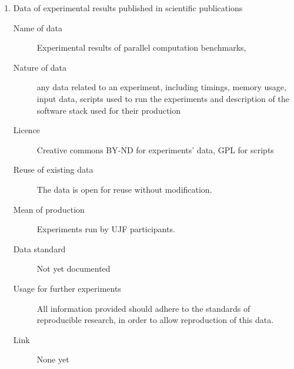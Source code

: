 \documentclass[12pt]{article}
\begin{document}
\begin{enumerate}
\item{Data of experimental results published in scientific publications}

\begin{description}
\item[Name of data] Experimental results of parallel computation benchmarks,
\item[Nature of data] any data related to an experiment, including timings,
  memory usage, input data, scripts used to run the experiments and description
  of the software stack used for their production
\item[Licence] Creative commons BY-ND for experiments' data, GPL for scripts
\item[Reuse of existing data] The data is open for reuse without modification.
\item[Mean of production] Experiments run by UJF participants.
\item[Data standard] Not yet documented
\item [Usage for further experiments] All information provided should adhere to
  the standards of reproducible research, in order to allow reproduction of
  this data.
\item [Link] None yet
\end{description}


\end{enumerate}
\end{document}
